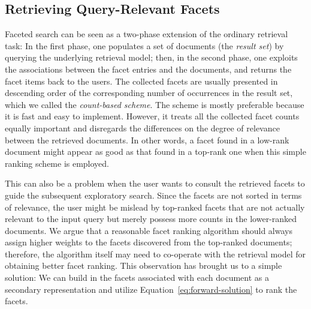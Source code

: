 \subsection{Retrieving Query-Relevant Facets}\label{s:facet-ranking}

Faceted search \cite{hearst2002finding,yee2003faceted,roy2008minimum} can be
seen as a two-phase extension of the ordinary retrieval task: In the first
phase, one populates a set of documents (the \emph{result set}) by querying the
underlying retrieval model; then, in the second phase, one exploits the
associations between the facet entries and the documents, and returns the facet
items back to the users.  The collected facets are usually presented in
descending order of the corresponding number of occurrences in the result set,
which we called the \emph{count-based scheme}.  The scheme is mostly preferable
because it is fast and easy to implement.  However, it treats all the collected
facet counts equally important and disregards the differences on the degree of
relevance between the retrieved documents.  In other words, a facet found in a
low-rank document might appear as good as that found in a top-rank one when
this simple ranking scheme is employed.

This can also be a problem when the user wants to consult the retrieved facets
to guide the subsequent exploratory search.  Since the facets are not sorted in
terms of relevance, the user might be mislead by top-ranked facets that are not
actually relevant to the input query but merely possess more counts in the
lower-ranked documents.  We argue that a reasonable facet ranking algorithm
should always assign higher weights to the facets discovered from the
top-ranked documents; therefore, the algorithm itself may need to co-operate
with the retrieval model for obtaining better facet ranking.  This observation
has brought us to a simple solution: We can build in the facets associated with
each document as a secondary representation and utilize
Equation~\ref{eq:forward-solution} to rank the facets.  


